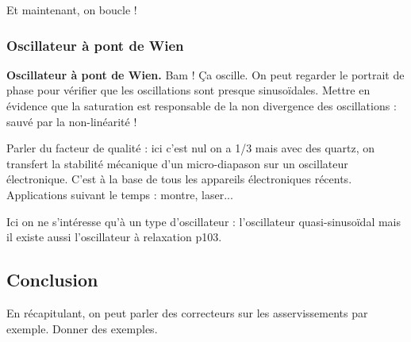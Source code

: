 \begin{transition}
Et maintenant, on boucle !
\end{transition}

\subsubsection{Oscillateur à pont de Wien}

\begin{experience}
\textbf{Oscillateur à pont de Wien.}
Bam ! Ça oscille.
On peut regarder le portrait de phase pour vérifier que les oscillations sont presque sinusoïdales.
Mettre en évidence que la saturation est responsable de la non divergence des oscillations : sauvé par la non-linéarité !
\end{experience}

Parler du facteur de qualité : ici c'est nul on a 1/3 mais avec des quartz, on transfert la stabilité mécanique d'un micro-diapason sur un oscillateur électronique.
C'est à la base de tous les appareils électroniques récents.
Applications suivant le temps : montre, laser...

\begin{remarque}
Ici on ne s'intéresse qu'à un type d'oscillateur : l'oscillateur quasi-sinusoïdal mais il existe aussi l'oscillateur à relaxation \cite{Neveu2019a} p103.
\end{remarque}

\subsection*{Conclusion}

En récapitulant, on peut parler des correcteurs sur les asservissements par exemple.
Donner des exemples.

\newpage